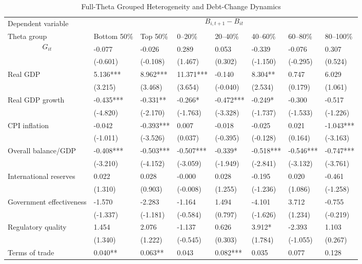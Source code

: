 \begin{table}[H]\centering
\begin{threeparttable}
\caption{Full-Theta Grouped Heterogeneity and Debt-Change Dynamics}
\label{tab:theta_group_heterogeneity_debt}
\scriptsize
\begin{tabularx}{\textwidth}{lYYYYYYY}
\toprule
Dependent variable &  \\
\cmidrule(lr){2-8}
Theta group & Bottom 50\% & Top 50\% & 0--20\% & 20--40\% & 40--60\% & 60--80\% & 80--100\% \\
\midrule
$$G_{it}$$ & -0.077 & -0.026 & 0.289 & 0.053 & -0.339 & -0.076 & 0.307 \\
  & (-0.601) & (-0.108) & (1.467) & (0.302) & (-1.150) & (-0.295) & (0.524) \\
Real GDP & 5.136*** & 8.962*** & 11.371*** & -0.140 & 8.304** & 0.747 & 6.029 \\
  & (3.215) & (3.468) & (3.654) & (-0.040) & (2.534) & (0.179) & (1.061) \\
Real GDP growth & -0.435*** & -0.331** & -0.266* & -0.472*** & -0.249* & -0.300 & -0.517 \\
  & (-4.820) & (-2.170) & (-1.763) & (-3.328) & (-1.737) & (-1.533) & (-1.226) \\
CPI inflation & -0.042 & -0.393*** & 0.007 & -0.018 & -0.025 & 0.021 & -1.043*** \\
  & (-1.011) & (-3.526) & (0.037) & (-0.395) & (-0.128) & (0.164) & (-3.163) \\
Overall balance/GDP & -0.408*** & -0.503*** & -0.507*** & -0.339* & -0.518*** & -0.546*** & -0.747*** \\
  & (-3.210) & (-4.152) & (-3.059) & (-1.949) & (-2.841) & (-3.132) & (-3.761) \\
International reserves & 0.022 & 0.028 & -0.000 & 0.028 & -0.195 & 0.020 & -0.461 \\
  & (1.310) & (0.903) & (-0.008) & (1.255) & (-1.236) & (1.086) & (-1.258) \\
Government effectiveness & -1.570 & -2.283 & -1.164 & 1.494 & -4.101 & 3.712 & -0.755 \\
  & (-1.337) & (-1.181) & (-0.584) & (0.797) & (-1.626) & (1.234) & (-0.219) \\
Regulatory quality & 1.454 & 2.076 & -1.137 & 0.626 & 3.912* & -2.393 & 1.103 \\
  & (1.340) & (1.222) & (-0.545) & (0.303) & (1.784) & (-1.055) & (0.267) \\
Terms of trade & 0.040** & 0.063** & 0.043 & 0.082*** & 0.035 & 0.077 & 0.128 \\

\end{tabularx}
\end{threeparttable}
\end{table}
